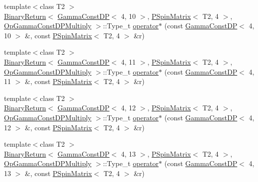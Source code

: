 \begin{DoxyCompactItemize}
\item 
{\footnotesize template$<$class T2 $>$ }\\\mbox{\hyperlink{structENSEM_1_1BinaryReturn}{Binary\+Return}}$<$ \mbox{\hyperlink{classENSEM_1_1GammaConstDP}{Gamma\+Const\+DP}}$<$ 4, 10 $>$, \mbox{\hyperlink{classENSEM_1_1PSpinMatrix}{P\+Spin\+Matrix}}$<$ T2, 4 $>$, \mbox{\hyperlink{structENSEM_1_1OpGammaConstDPMultiply}{Op\+Gamma\+Const\+D\+P\+Multiply}} $>$\+::Type\+\_\+t \mbox{\hyperlink{group__primspinmatrix_gad3aa1e55d31246f4c4f0a15456a84fea}{operator$\ast$}} (const \mbox{\hyperlink{classENSEM_1_1GammaConstDP}{Gamma\+Const\+DP}}$<$ 4, 10 $>$ \&, const \mbox{\hyperlink{classENSEM_1_1PSpinMatrix}{P\+Spin\+Matrix}}$<$ T2, 4 $>$ \&r)
\item 
{\footnotesize template$<$class T2 $>$ }\\\mbox{\hyperlink{structENSEM_1_1BinaryReturn}{Binary\+Return}}$<$ \mbox{\hyperlink{classENSEM_1_1GammaConstDP}{Gamma\+Const\+DP}}$<$ 4, 11 $>$, \mbox{\hyperlink{classENSEM_1_1PSpinMatrix}{P\+Spin\+Matrix}}$<$ T2, 4 $>$, \mbox{\hyperlink{structENSEM_1_1OpGammaConstDPMultiply}{Op\+Gamma\+Const\+D\+P\+Multiply}} $>$\+::Type\+\_\+t \mbox{\hyperlink{group__primspinmatrix_ga763e216e29f923dec37a54603419bb2c}{operator$\ast$}} (const \mbox{\hyperlink{classENSEM_1_1GammaConstDP}{Gamma\+Const\+DP}}$<$ 4, 11 $>$ \&, const \mbox{\hyperlink{classENSEM_1_1PSpinMatrix}{P\+Spin\+Matrix}}$<$ T2, 4 $>$ \&r)
\item 
{\footnotesize template$<$class T2 $>$ }\\\mbox{\hyperlink{structENSEM_1_1BinaryReturn}{Binary\+Return}}$<$ \mbox{\hyperlink{classENSEM_1_1GammaConstDP}{Gamma\+Const\+DP}}$<$ 4, 12 $>$, \mbox{\hyperlink{classENSEM_1_1PSpinMatrix}{P\+Spin\+Matrix}}$<$ T2, 4 $>$, \mbox{\hyperlink{structENSEM_1_1OpGammaConstDPMultiply}{Op\+Gamma\+Const\+D\+P\+Multiply}} $>$\+::Type\+\_\+t \mbox{\hyperlink{group__primspinmatrix_gac9db04966aafec7cc5029c5dc0e37d4d}{operator$\ast$}} (const \mbox{\hyperlink{classENSEM_1_1GammaConstDP}{Gamma\+Const\+DP}}$<$ 4, 12 $>$ \&, const \mbox{\hyperlink{classENSEM_1_1PSpinMatrix}{P\+Spin\+Matrix}}$<$ T2, 4 $>$ \&r)
\item 
{\footnotesize template$<$class T2 $>$ }\\\mbox{\hyperlink{structENSEM_1_1BinaryReturn}{Binary\+Return}}$<$ \mbox{\hyperlink{classENSEM_1_1GammaConstDP}{Gamma\+Const\+DP}}$<$ 4, 13 $>$, \mbox{\hyperlink{classENSEM_1_1PSpinMatrix}{P\+Spin\+Matrix}}$<$ T2, 4 $>$, \mbox{\hyperlink{structENSEM_1_1OpGammaConstDPMultiply}{Op\+Gamma\+Const\+D\+P\+Multiply}} $>$\+::Type\+\_\+t \mbox{\hyperlink{group__primspinmatrix_ga6ecc3bf3d92d81202c48dce547f7027f}{operator$\ast$}} (const \mbox{\hyperlink{classENSEM_1_1GammaConstDP}{Gamma\+Const\+DP}}$<$ 4, 13 $>$ \&, const \mbox{\hyperlink{classENSEM_1_1PSpinMatrix}{P\+Spin\+Matrix}}$<$ T2, 4 $>$ \&r)

\end{DoxyCompactItemize}
